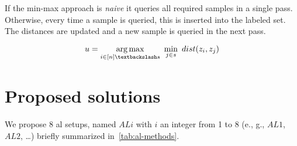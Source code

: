     If the min-max approach is \emph{naive} it queries all required samples in a single pass.
    Otherwise, every time a sample is queried, this is inserted into the labeled set. The distances are updated and a new sample is queried in the next pass.
    
    \begin{equation}
        u = \argmax_{i\in [n]\textbackslash s}~\min_{j\in s}~dist(z_i, z_j)
        \label{eq:core-set}
    \end{equation}
    
    
\section{Proposed solutions}
    \label{sub:al}
    We propose 8 \acrshort{al} setups, named $ALi$ with $i$ an integer from 1 to 8 (e., g., $AL1$, $AL2$, \dots) briefly summarized in~\autoref{tab:al-methods}.
    
